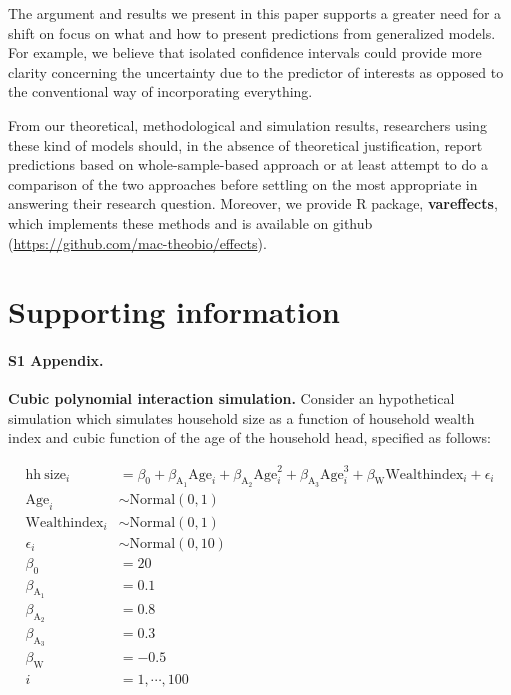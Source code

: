 \documentclass[10pt,letterpaper]{article}
\newcommand{\pkg}[1]{\textbf{#1}}
\let\proglang=\textsf
\begin{document}
The argument and results we present in this paper supports a greater need for a shift on focus on what and how to present predictions from generalized models. For example, we believe that isolated confidence intervals could provide more clarity concerning the uncertainty due to the predictor of interests as opposed to the conventional way of incorporating everything. 

From our theoretical, methodological and simulation results, researchers using these kind of models should, in the absence of theoretical justification, report predictions based on whole-sample-based approach or at least attempt to do a comparison of the two approaches before settling on the most appropriate in answering their research question. Moreover, we provide \proglang{R} package, \pkg{vareffects}, which implements these methods and is available on github (\href{https://github.com/mac-theobio/effects}{https://github.com/mac-theobio/effects}).


\section*{Supporting information}

\paragraph*{S1 Appendix.}
\label{S1_Appendix}
{\bf Cubic polynomial interaction simulation.} Consider an hypothetical simulation which simulates household size as a function of household wealth index and cubic function of the age of the household head, specified as follows:

\begin{align}\label{sim:lm_cubic}
\mathrm{hh~size}_i &= \beta_0 + \beta_{\mathrm{A_1}}\mathrm{Age}_i + \beta_{\mathrm{A_2}}\mathrm{Age}^2_i + \beta_{\mathrm{A_3}}\mathrm{Age}^3_i + \beta_{\mathrm{W}}\mathrm{Wealthindex}_i + \epsilon_i \nonumber\\
\mathrm{Age}_i &\sim \mathrm{Normal}(0, 1) \nonumber\\
\mathrm{Wealthindex}_i &\sim \mathrm{Normal}(0, 1) \nonumber\\
\epsilon_i &\sim \mathrm{Normal}(0, 10) \nonumber\\
\beta_0 &= 20 \nonumber\\
\beta_{\mathrm{A}_1} &= 0.1 \nonumber\\
\beta_{\mathrm{A}_2} &= 0.8 \nonumber\\
\beta_{\mathrm{A}_3} &= 0.3 \nonumber\\
\beta_{\mathrm{W}} &= -0.5 \nonumber\\
i &= 1,\cdots, 100
\end{align}
\end{document}
